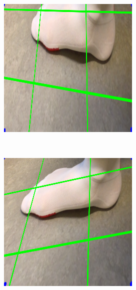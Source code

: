 \documentclass{kththesis}
\begin{document}
\begin{figure}[h]
      \begin{subfigure}[b]{0.3\textwidth}
        \includegraphics[width=\textwidth]{augmented1}
    \end{subfigure}
    ~ %
    \begin{subfigure}[b]{0.3\textwidth}
        \includegraphics[width=\textwidth]{augmented2}

\end{subfigure}
\end{figure}
\end{document}
